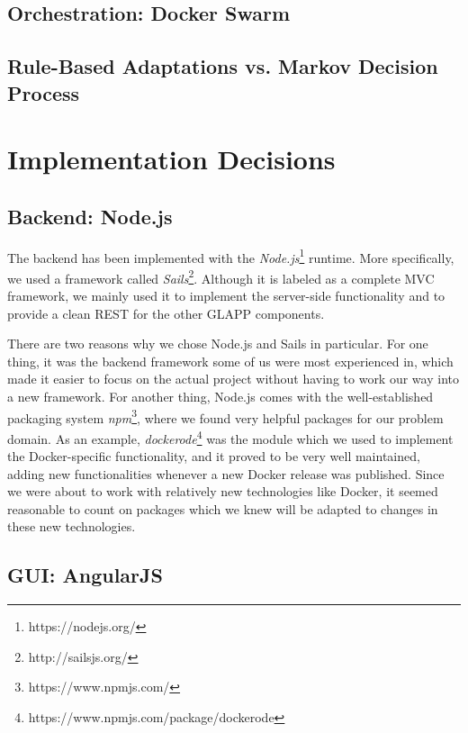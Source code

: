 \documentclass{seal_thesis}
\begin{document}
\subsection{Orchestration: Docker Swarm}

\subsection{Rule-Based Adaptations vs. Markov Decision Process}


\section{Implementation Decisions}
\subsection{Backend: Node.js}
The backend has been implemented with the \textit{Node.js}\footnote{https://nodejs.org/} runtime.
More specifically, we used a framework called \textit{Sails}\footnote{http://sailsjs.org/}.
Although it is labeled as a complete MVC framework, we mainly used it to implement the server-side functionality and to provide a clean REST for the other GLAPP components.

There are two reasons why we chose Node.js and Sails in particular.
For one thing, it was the backend framework some of us were most experienced in, which made it easier to focus on the actual project without having to work our way into a new framework.
For another thing, Node.js comes with the well-established packaging system \textit{npm}\footnote{https://www.npmjs.com/}, where we found very helpful packages for our problem domain.
As an example, \textit{dockerode}\footnote{https://www.npmjs.com/package/dockerode} was the module which we used to implement the Docker-specific functionality, and it proved to be very well maintained, adding new functionalities whenever a new Docker release was published.
Since we were about to work with relatively new technologies like Docker, it seemed reasonable to count on packages which we knew will be adapted to changes in these new technologies.

\subsection{GUI: AngularJS}
\end{document}
